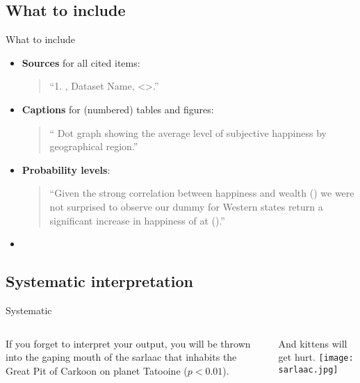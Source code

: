 \documentclass[t]{beamer}
\begin{document}
	\subsection{What to include}
	
	\begin{frame}[t]{What to include}

		\begin{itemize}

			\item \textbf{Sources} for all cited items:\\
				\begin{quote}``1. , Dataset Name,  \textless{}\textgreater.''\end{quote}

			\item \textbf{Captions} for (numbered) tables and figures: \\
			\begin{quote}
			`` Dot graph showing the average level of subjective happiness by geographical region.''
			\end{quote}

			\item \textbf{Probability levels}: \\
			\begin{quote}``Given the strong correlation between happiness and wealth () we were not surprised to observe our dummy for Western states return a significant increase in happiness of  at  ().''\end{quote}

			\item \textbf{}

		\end{itemize}

	\end{frame}
	
	\subsection{Systematic interpretation}

	\begin{frame}[t]{Systematic }
		\begin{columns}[T]
			If you forget to interpret your output, you will be thrown into the gaping mouth of the sarlaac that inhabits the Great Pit of Carkoon on planet Tatooine ($p < 0.01$).\vspace{1em}
			
			And kittens will get hurt.
			\texttt{[image: sarlaac.jpg]}
		\end{columns}
	\end{frame}
\end{document}
